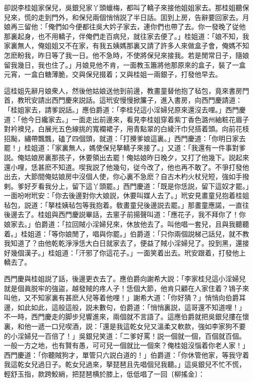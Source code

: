 卻説李桂姐家保兒，吳銀兒家丫頭蠟梅，都叫了轎子來接他姐姐家去。那桂姐聽保兒來，慌的走到門外，和保兒兩個悄悄説了半日話。囬到上房，告辭要回家去。月娘再三留他：「俺們如今便都往吳大妗子家去，連你們也帶了去。你一發晚了従他那裏起身，也不用轎子，伴俺們走百病兒，就往家去便了。」桂姐道：「娘不知，我家裏無人，俺姐姐又不在家，有我五姨媽那裏又請了許多人來做盒子會，俺媽不知怎麽盼我，昨日等了我一日。他不急時，不使將保兒來接我。若是閒常日子，隨娘留我幾日，我也住了。」月娘見他不肯，一面教玉簫將他那原來的盒子，裝了一盒元宵，一盒白糖薄脆，交與保兒掇着；又與桂姐一兩銀子，打發他早去。

這桂姐先辭月娘衆人，然後他姑娘送他到前邊，教畫童替他抱了毡包，竟來書房門首，教玳安請出西門慶來説話。這玳安慢慢掀簾子，進入書房，向西門慶請道：「桂姐家去，請爹説話。」應伯爵道：「李桂兒這小淫婦兒原來還沒去哩。」西門慶道：「他今日纔家去。」一面走出前邊來，看見李桂姐穿着紫丁香色潞州紬粧花眉子對衿襖兒，白展光五色線挑的寬襴裙子，用青點翠的白綾汗巾兒搭着頭。向前花枝招颭，繡帶飄飄，磕了四個頭，就道：「打攪爹娘這裏。」西門慶道：「你明日家去罷！」桂姐道：「家裏無人，媽使保兒拏轎子來接了。」又道：「我還有一件事對爹説。俺姑娘房裏那孩子，休要領出去罷！俺姑娘昨日晚夕，又打了他幾下。説起來還小哩，恁甚麽不知道。喫我説了他幾句，従今改了，他也再不敢了。不爭打發他出去，大節間俺姑娘房中沒個人使，你心裏不急麽？自古木杓火杖兒短，強如手撥剌。爹好歹看我分上，留下這丫頭罷。」西門慶道：「既是你恁説，留下這奴才罷。」一面吩咐玳安：「你去後邊對你大娘説，休要叫媒人去了。」玳安見畫童兒抱着桂姐毡包，説道：「拏桂姨毡包等我抱着。敎畫童兒後邊説去罷。」那畫童應諾，一直往後邊去了。桂姐與西門慶説畢話，去窻子前揚聲叫道：「應花子，我不拜你了！你娘家去。」伯爵道：「拉回賊小淫婦兒來，休放他去了。叫他唱一套兒，且與我聽聽着。」桂姐道：「等你娘閒了，唱與你罷。」伯爵道：「只你兩個説梯己話兒，就不教我知道了？由他乾乾淨淨恁大白日就家去了，便益了賊小淫婦兒了。投到黑，還接好幾個漢子。」桂姐道：「汗邪了你這花子。」一面笑着出去。玳安跟着，打發他上轎去了。

西門慶與桂姐説了話，後邊更衣去了。應伯爵向謝希大説：「李家桂兒這小淫婦兒就是個眞脱牢的強盜，越發賊的疼人子！恁個大節，他肯只顧在人家住着？鴇子來叫他，又不知家裏有甚麽人兒等着他哩！」謝希大道：「你好猜？」悄悄向伯爵耳邊，如此如此，這般這般，説未數句，伯爵道：「悄悄裏説，這哥還不知道哩！」不一時，西門慶走的脚步兒響進來，兩個就不言語了。這應伯爵就把吳銀兒摟在懷裏，和他一遞一口兒喫酒，説：「還是我這乾女兒又溫柔又軟款，強如李家狗不要的小淫婦兒一百倍了！」吳銀兒笑道：「二爹好罵！説一個就一個，百個就百個。一般一方之地，也有賢有愚，可可兒一個就比一個來？俺桂姐沒惱着你老人家！」西門慶道：「你聽賊狗才，單管只六説白道的！」伯爵道：「你休管他家，等我守着我這乾女兒過日子。乾女兒過來，拏琵琶且先唱個兒我聽。」這吳銀兒不忙不慌，輕舒玉指，款跨鮫綃，把琵琶横於膝上，低低唱了一回〔柳搖金〕：

